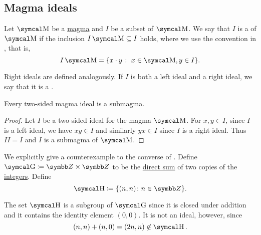 \subsection{Magma ideals}\label{sec:magma_ideals}

\begin{definition}\label{def:magma_ideal}
  Let \( \CM \) be a \hyperref[def:magma]{magma} and \( I \) be a subset of \( \CM \). We say that \( I \) is a  of \( \CM \) if the inclusion \( I\CM \subseteq I \) holds, where we use the convention in , that is,
  \begin{equation*}
    I \CM = \{ x \cdot y \;\colon\; x \in \CM, y \in I \}.
  \end{equation*}

  Right ideals are defined analogously. If \( I \) is both a left ideal and a right ideal, we say that it is a .
\end{definition}

\begin{proposition}\label{thm:magma_ideal_is_submagma}
  Every two-sided magma ideal is a submagma.
\end{proposition}
\begin{proof}
  Let \( I \) be a two-sided ideal for the magma \( \CM \). For \( x, y \in I \), since \( I \) is a left ideal, we have \( xy \in I \) and similarly \( yx \in I \) since \( I \) is a right ideal. Thus \( II = I \) and \( I \) is a submagma of \( \CM \).
\end{proof}

\begin{example}\label{ex:subgroup_is_not_ideal}
  We explicitly give a counterexample to the converse of . Define \( \CG \coloneqq \BZ \times \BZ \) to be the \hyperref[def:group_direct_sum]{direct sum} of two copies of the \hyperref[def:integers]{integers}. Define
  \begin{equation*}
    \CH \coloneqq \{ (n, n) \colon n \in \BZ \}.
  \end{equation*}

  The set \( \CH \) is a subgroup of \( \CG \) since it is closed under addition and it contains the identity element \( (0, 0) \). It is not an ideal, however, since
  \begin{equation*}
    (n, n) + (n, 0) = (2n, n) \not\in \CH.
  \end{equation*}
\end{example}

